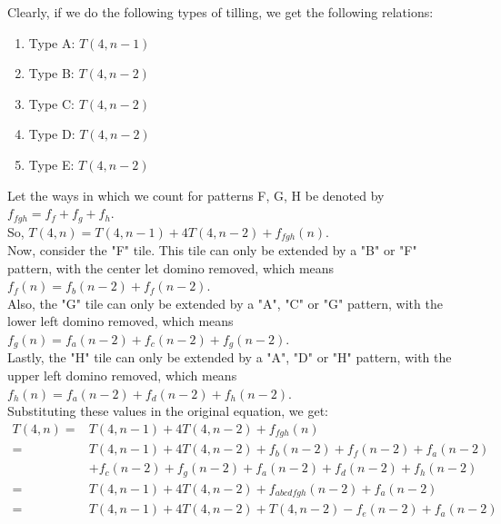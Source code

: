 \documentclass[a4paper]{article}
\begin{document}
\begin{enumerate}
\begin{enumerate}
            Clearly, if we do the following types of tilling, we get the following relations:\\
            \begin{enumerate}
                \item Type A: $T(4, n-1)$
                \item Type B: $T(4, n-2)$
                \item Type C: $T(4, n-2)$
                \item Type D: $T(4, n-2)$
                \item Type E: $T(4, n-2)$
            \end{enumerate}

            Let the ways in which we count for patterns F, G, H be denoted by $f_{fgh} = f_f + f_g + f_h$. \\

            So, $T(4, n) = T(4, n-1) + 4T(4, n-2) + f_{fgh}(n)$. \\

            Now, consider the "F" tile. This tile can only be extended by a "B" or "F" pattern, with the center let domino removed, which means $f_f(n) = f_b(n-2) + f_f(n-2)$. \\

            Also, the "G" tile can only be extended by a "A", "C" or "G" pattern, with the lower left domino removed, which means $f_g(n) = f_a(n-2) + f_c(n-2) + f_g(n-2)$. \\

            Lastly, the "H" tile can only be extended by a "A", "D" or "H" pattern, with the upper left domino removed, which means $f_h(n) = f_a(n-2) + f_d(n-2) + f_h(n-2)$. \\

            Substituting these values in the original equation, we get:
            \[
                \begin{split}
                    T(4, n) =& T(4, n-1) + 4T(4, n-2) + f_{fgh}(n) \\
                    =& T(4, n-1) + 4T(4, n-2) + f_b(n-2) + f_f(n-2) + f_a(n-2) \\
                    &+ f_c(n-2) + f_g(n-2) + f_a(n-2) + f_d(n-2) + f_h(n-2) \\
                    =& T(4, n-1) + 4T(4, n-2) + f_{abcdfgh}(n-2) + f_{a}(n-2) \\
                    =& T(4, n-1) + 4T(4, n-2) + T(4, n-2) - f_e(n-2) + f_a(n-2) \\
                \end{split}
            \]


\end{enumerate}
\end{enumerate}
\end{document}
